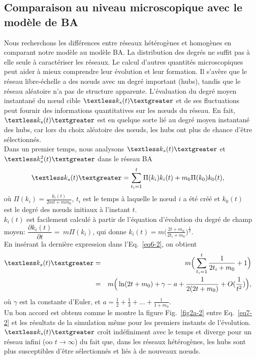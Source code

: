 \subsection{Comparaison au niveau microscopique avec le modèle de BA}
 Nous recherchons les différences entre réseaux hétérogènes et homogènes en comparant notre modèle au modèle BA. La distribution des degrés ne suffit pas à elle seule à caractériser les réseaux. Le calcul d'autres quantités microscopiques peut aider à mieux comprendre leur évolution et leur formation. Il s'avère que le réseau libre-échelle a des nœuds avec un degré important (hubs), tandis que le réseau aléatoire n'a pas de structure apparente. L'évaluation du degré moyen instantané du nœud cible $\kms$ et de ses fluctuations peut fournir des informations quantitatives sur les nœuds du réseau. En fait, $\kms$ est en quelque sorte lié au degré moyen instantané des hubs, car lors du choix aléatoire des nœuds, les hubs ont plus de chance d'être sélectionnés. \\  
 Dans un premier temps, nous analysons $\kms$ et $\kmss$ dans le réseau BA
 \begin{eqnarray}
 \kms=\sum_{t_i=1}^t\Pi(k_i)k_i(t)+m_0\Pi(k_0)k_0(t),
 \label{eq6-2}
 \end{eqnarray}
 où  $\Pi(k_i)=\frac{k_i(t)}{2mt+mm_0}$, $t_i$ est le temps à laquelle le nœud $ i $ a été créé et $ k_0 (t) $ est le degré des nœuds initiaux à l'instant $t$.\\
 $k_i (t)$ est facilement calculé à partir de l'équation d'évolution du degré de champ moyen:
 $\dfrac{\partial k_i(t)}{\partial t}=~ m\Pi(k_i)$, qui donne $k_i(t)=m\Big(\frac{2t+m_0}{2t_i+m_0}\Big)^{\frac{1}{2}}$.\\
 En insérant la dernière expression dans l'Eq.~\ref{eq6-2}, on obtient
 \begin{eqnarray}
 \kms&=&m\Big(\sum_{t_i=1}^{t}\dfrac{1}{2t_i+m_0}+1\Big) \\
 &=&m \Big(\ln (2t+m_0)+\gamma-a+\frac{1}{2(2t+m_0)}+O(\frac{1}{t^2})\Big),
 \label{eq7-2}
 \end{eqnarray}
 où $\gamma$ est la constante d'Euler, et $a=\frac{1}{2}+\frac{1}{3}+\ldots+\frac{1}{1+m_0}$.\\
 Un bon accord est obtenu comme le montre la figure Fig.~\ref{fig2a-2} entre Eq.~\ref{eq7-2} et les résultats de la simulation même pour les premiers instants de l'évolution. $\kms$ croît indéfiniment avec le temps et diverge pour un réseau infini (oo $t\to\infty$) du fait que, dans les réseaux hétérogènes, les hubs sont plus susceptibles d'être sélectionnés et liés à de nouveaux nœuds. \\
